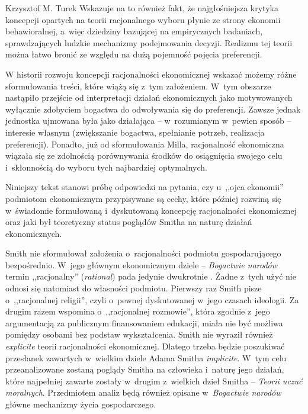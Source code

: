 \begin{artplenv}{Krzysztof M. Turek}
Wskazuje na to również fakt, że najgłośniejsza krytyka koncepcji opartych na teorii racjonalnego wyboru płynie ze strony
ekonomii behawioralnej, a~więc dziedziny bazującej na empirycznych badaniach, sprawdzających ludzkie mechanizmy
podejmowania decyzji. Realizmu tej teorii można łatwo bronić ze względu na dużą pojemność pojęcia preferencji.

W historii rozwoju koncepcji racjonalności ekonomicznej wskazać możemy różne sformułowania treści, które wiążą się z~tym
założeniem. W~tym obszarze nastąpiło przejście od interpretacji działań ekonomicznych jako motywowanych wyłącznie
zdobyciem bogactwa do odwoływania się do preferencji. Zawsze jednak jednostka ujmowana była jako
działająca -- w~rozumianym w~pewien sposób -- interesie własnym (zwiększanie bogactwa, spełnianie potrzeb,
realizacja preferencji).
Ponadto, już od sformułowania Milla, racjonalność ekonomiczna wiązała się ze zdolnością porównywania środków do
osiągnięcia swojego celu i~skłonnością do wyboru tych najbardziej optymalnych.

Niniejszy tekst stanowi próbę odpowiedzi na pytania, czy u~,,ojca ekonomii'' podmiotom ekonomicznym przypisywane są cechy,
które później rozwiną się w~świadomie formułowaną i~dyskutowaną koncepcję racjonalności ekonomicznej oraz jaki był
teoretyczny status poglądów Smitha na naturę działań ekonomicznych.

Smith nie sformułował założenia o~racjonalności podmiotu gospodarującego bezpośrednio. W~jego głównym ekonomicznym
dziele -- \textit{Bogactwie narodów} termin ,,racjonalny'' (\textit{rational}) pada
jedynie dwukrotnie
\parencite[s.~603 i~612]{smith_inquiry_2007}.
Żadne z~tych użyć nie odnosi się natomiast do
własności podmiotu. Pierwszy raz Smith pisze o~,,racjonalnej religii'', czyli o~pewnej dyskutowanej w~jego czasach
ideologii. Za drugim razem wspomina o~,,racjonalnej rozmowie'', która zgodnie z~jego argumentacją za publicznym
finansowaniem edukacji, miała nie być możliwa pomiędzy osobami bez podstaw wykształcenia. Smith nie wyraził również
\textit{explicite} teorii racjonalności ekonomicznej. Dlatego trzeba będzie poszukiwać przesłanek zawartych w~wielkim
dziele Adama Smitha \textit{implicite}. W~tym celu przeanalizowane zostaną poglądy Smitha na człowieka i~naturę jego
działań, które najpełniej zawarte zostały w~drugim z~wielkich dzieł Smitha -- \textit{Teorii uczuć moralnych}.
Przedmiotem analiz będą również opisane w~\textit{Bogactwie narodów} główne mechanizmy życia gospodarczego.


\end{artplenv}
